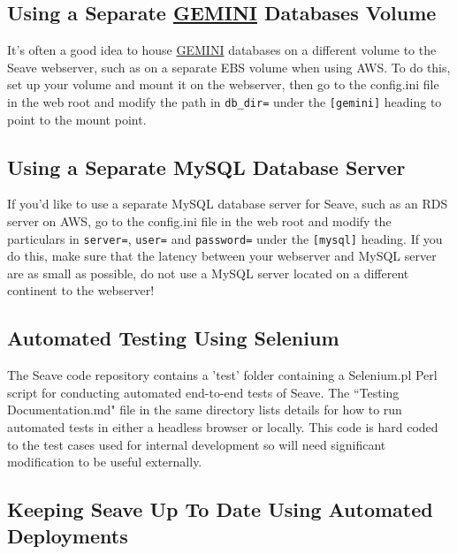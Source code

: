 \documentclass[11pt, a4paper]{article}
\newcommand{\GEMINI}{\href{https://gemini.readthedocs.io}{GEMINI} } %
\begin{document}

\subsection{Using a Separate \GEMINI Databases Volume}

It's often a good idea to house \GEMINI databases on a different volume to the Seave webserver, such as on a separate EBS volume when using AWS. To do this, set up your volume and mount it on the webserver, then go to the config.ini file in the web root and modify the path in \texttt{db\_dir=} under the \texttt{[gemini]} heading to point to the mount point.


\subsection{Using a Separate MySQL Database Server}

If you'd like to use a separate MySQL database server for Seave, such as an RDS server on AWS, go to the config.ini file in the web root and modify the particulars in \texttt{server=}, \texttt{user=} and \texttt{password=} under the \texttt{[mysql]} heading. If you do this, make sure that the latency between your webserver and MySQL server are as small as possible, do not use a MySQL server located on a different continent to the webserver!


\subsection{Automated Testing Using Selenium}

The Seave code repository contains a 'test' folder containing a Selenium.pl Perl script for conducting automated end-to-end tests of Seave. The ``Testing Documentation.md" file in the same directory lists details for how to run automated tests in either a headless browser or locally. This code is hard coded to the test cases used for internal development so will need significant modification to be useful externally.


\subsection{Keeping Seave Up To Date Using Automated Deployments}
\end{document}
